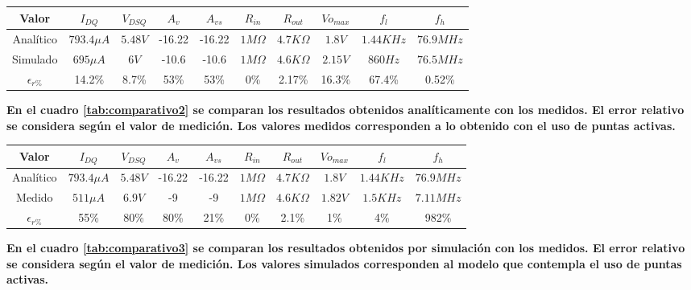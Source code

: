\documentclass[a4paper, 10pt, spanish]{article}
\begin{document}
\begin{center}
  \begin{tabular}{|c|c|c|c|c|c|c|c|c|c|}
    \hline
    Valor & $I_{DQ}$ & $V_{DSQ}$ & $A_v$ & $A_{vs}$ & $R_{in}$ & $R_{out}$ & $V{o_{max}}$ & $f_l$ & $f_h$ \\
    \hline
    Analítico & $793.4\mu A$& $5.48V$& -16.22 & -16.22 & $1M\Omega$ & $4.7K\Omega$ & $1.8V$ & $1.44KHz$ & $76.9MHz$ \\
    \hline
    Simulado & $695\mu A$ & $6V$ & -10.6 & -10.6 & $1M\Omega$ & $4.6K\Omega$ & $2.15V$ & $860Hz$ & $76.5MHz$ \\
    \hline
    $\epsilon_{r\%}$ & 14.2\% & 8.7\% & 53\% & 53\% & 0\% & 2.17\% & 16.3\% & 67.4\% & 0.52\% \\
    \hline
  \end{tabular}
  \label{tab:comparativo1}
\end{center}

\textbf{En el cuadro \ref{tab:comparativo2} se comparan los resultados obtenidos analíticamente con los medidos. El error relativo se considera según el valor de medición. Los valores medidos corresponden a lo obtenido con el uso de puntas activas.}

\begin{center}
  \begin{tabular}{|c|c|c|c|c|c|c|c|c|c|}
    \hline
    Valor & $I_{DQ}$ & $V_{DSQ}$ & $A_v$ & $A_{vs}$ & $R_{in}$ & $R_{out}$ & $V{o_{max}}$ & $f_l$ & $f_h$ \\
    \hline
    Analítico & $793.4\mu A$& $5.48V$& -16.22 & -16.22 & $1M\Omega$ & $4.7K\Omega$ & $1.8V$ & $1.44KHz$ & $76.9MHz$ \\
    \hline
    Medido & $511\mu A$ & $6.9V$ & -9 & -9 & $1M\Omega$ & $4.6K\Omega$ & $1.82V$ & $1.5KHz$ & $7.11MHz$ \\
    \hline
    $\epsilon_{r\%}$ & 55\% & 80\% & 80\% & 21\% & 0\% & 2.1\% & 1\% & 4\% & 982\% \\
    \hline
  \end{tabular}
  \label{tab:comparativo2}
\end{center}

\textbf{En el cuadro \ref{tab:comparativo3} se comparan los resultados obtenidos por simulación con los medidos. El error relativo se considera según el valor de medición. Los valores simulados corresponden al modelo que contempla el uso de puntas activas.}
\end{document}
